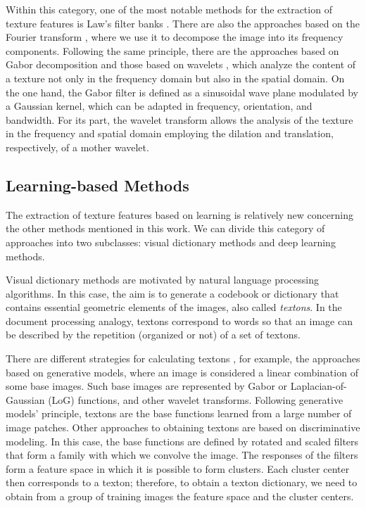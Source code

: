 Within this category, one of the most notable methods for the extraction of texture features is Law's filter banks \citep{Laws:IUW:1979, Laws:IPMG:1980, Laws:Report:1980}. There are also the approaches based on the Fourier transform \citep{Ursani.Kpalma.ea:ICMV:2007}, where we use it to decompose the image into its frequency components. Following the same principle, there are the approaches based on Gabor decomposition \citep{Gabor:JIEE:1946} and those based on wavelets  \citep{Arivazhagan.Ganesan:PR:2003}, which analyze the content of a texture not only in the frequency domain but also in the spatial domain. On the one hand, the Gabor filter is defined as a sinusoidal wave plane modulated by a Gaussian kernel, which can be adapted in frequency, orientation, and bandwidth. For its part, the wavelet transform allows the analysis of the texture in the frequency and spatial domain employing the dilation and translation, respectively, of a mother wavelet.

\subsection{Learning-based Methods}
The extraction of texture features based on learning is relatively new concerning the other methods mentioned in this work. We can divide this category of approaches into two subclasses: visual dictionary methods and deep learning methods.

Visual dictionary methods are motivated by natural language processing algorithms. In this case, the aim is to generate a codebook or dictionary that contains essential geometric elements of the images, also called \textit{textons}. In the document processing analogy, textons correspond to words so that an image can be described by the repetition (organized or not) of a set of textons.

There are different strategies for calculating textons \citep{Zhu.Guo.ea:IJCV:2005}, for example, the approaches based on generative models, where an image is considered a linear combination of some base images. Such base images are represented by Gabor or Laplacian-of-Gaussian (LoG) functions, and other wavelet transforms. Following generative models' principle, textons are the base functions learned from a large number of image patches. 
Other approaches to obtaining textons are based on discriminative modeling. In this case, the base functions are defined by rotated and scaled filters that form a family with which we convolve the image. The responses of the filters form a feature space in which it is possible to form clusters. Each cluster center then corresponds to a texton; therefore, to obtain a texton dictionary, we need to obtain from a group of training images the feature space and the cluster centers.

